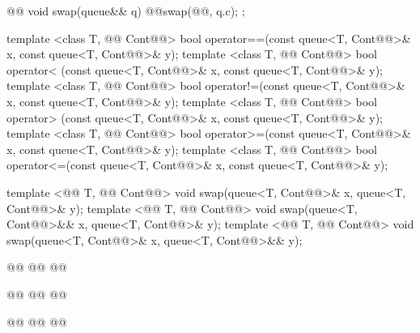 \documentclass[american,twoside]{book}
\begin{document}
\begin{codeblock}
{{    @@
      void swap(queue&& q)              { @@swap(@@, q.c); }
  };

  template <class T, @@ Cont@@>
    bool operator==(const queue<T, Cont@@>& x, const queue<T, Cont@@>& y);
  template <class T, @@ Cont@@>
    bool operator< (const queue<T, Cont@@>& x, const queue<T, Cont@@>& y);
  template <class T, @@ Cont@@>
    bool operator!=(const queue<T, Cont@@>& x, const queue<T, Cont@@>& y);
  template <class T, @@ Cont@@>
    bool operator> (const queue<T, Cont@@>& x, const queue<T, Cont@@>& y);
  template <class T, @@ Cont@@>
    bool operator>=(const queue<T, Cont@@>& x, const queue<T, Cont@@>& y);
  template <class T, @@ Cont@@>
    bool operator<=(const queue<T, Cont@@>& x, const queue<T, Cont@@>& y);

  template <@@ T, @@ Cont@@>
    void swap(queue<T, Cont@@>& x, queue<T, Cont@@>& y);
  template <@@ T, @@ Cont@@>
    void swap(queue<T, Cont@@>&& x, queue<T, Cont@@>& y);
  template <@@ T, @@ Cont@@>
    void swap(queue<T, Cont@@>& x, queue<T, Cont@@>&& y);

  @@
    @@
    @@

  @@
    @@
      @@

  @@
    @@
      @@
}
\end{codeblock}
\end{document}
